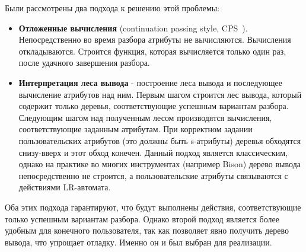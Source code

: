 Были рассмотрены два подхода к решению этой проблемы: 
\begin{itemize}

	\item {\bfseries Отложенные вычисления} (continuation passing style, CPS~\cite{CPS}). Непосредственно во время разбора атрибуты не вычисляются. Вычисления откладываются. Строится функция, которая вычисляется только один раз, после удачного завершения разбора.
	
	\item {\bfseries Интерпретация леса вывода} - построение леса вывода и последующее вычисление атрибутов над ним. Первым шагом строится лес вывода, который содержит только деревья, соответствующие успешным вариантам разбора. Следующим шагом над полученным лесом производятся вычисления, соответствующие заданным атрибутам. При корректном задании пользовательских атрибутов (это должны быть s-атрибуты) деревья обходятся снизу-вверх и этот обход конечен.
Данный подход является классическим, однако на практике во многих инструментах (например Bison) дерево вывода непосредственно не строится, а пользовательские атрибуты связываются с действиями LR-автомата.
	
\end{itemize}

Оба этих подхода гарантируют, что будут выполнены действия, соответствующие только успешным вариантам разбора. Однако второй подход является более удобным для конечного пользователя, так как позволяет явно получить дерево вывода, что упрощает отладку. Именно он и был выбран для реализации.
